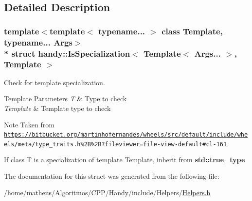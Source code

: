 \subsection{Detailed Description}
\subsubsection*{template$<$template$<$ typename... $>$ class Template, typename... Args$>$\\*
struct handy\+::\+Is\+Specialization$<$ Template$<$ Args... $>$, Template $>$}

Check for template specialization. 


\begin{DoxyTemplParams}{Template Parameters}
{\em T} & Type to check \\
\hline
{\em Template} & Template type to check \\
\hline
\end{DoxyTemplParams}
\begin{DoxyNote}{Note}
Taken from \href{https://bitbucket.org/martinhofernandes/wheels/src/default/include/wheels/meta/type_traits.h%2B%2B?fileviewer=file-view-default#cl-161}{\tt https\+://bitbucket.\+org/martinhofernandes/wheels/src/default/include/wheels/meta/type\+\_\+traits.\+h\%2\+B\%2\+B?fileviewer=file-\/view-\/default\#cl-\/161}
\end{DoxyNote}
If class {\ttfamily T} is a specialization of template {\ttfamily Template}, inherit from {\bf std\+::true\+\_\+type} 

The documentation for this struct was generated from the following file\+:\begin{DoxyCompactItemize}
\item 
/home/matheus/\+Algoritmos/\+C\+P\+P/\+Handy/include/\+Helpers/\hyperlink{Helpers_2Helpers_8h}{Helpers.\+h}\end{DoxyCompactItemize}
